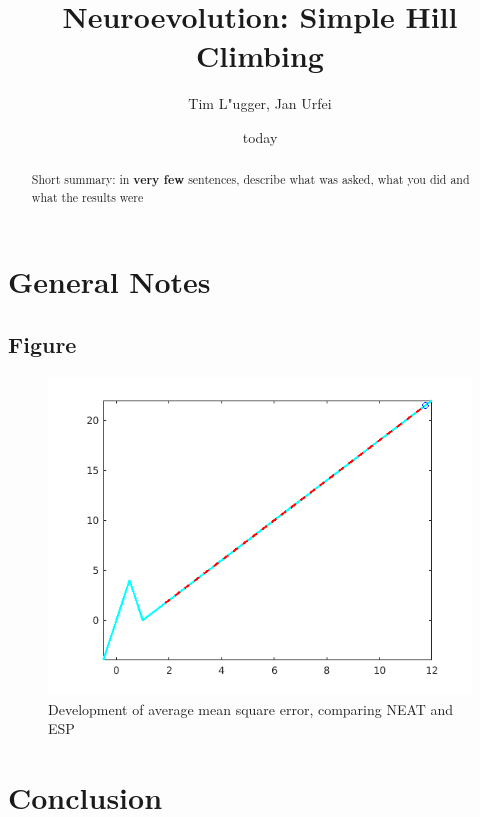 \documentclass{hbrs-ecta-report}
\begin{document}

\title{Neuroevolution: Simple Hill Climbing}
\subtitle{}

\author{
\alignauthor
Tim L"ugger, Jan Urfei
}

\date{today}
\maketitle
\begin{abstract}
Short summary: in \textbf{very few} sentences, describe what was asked, what you did and what the results were
\end{abstract}

\section{General Notes}

\FloatBarrier
\newpage
\subsection{Figure}

\begin{figure}[ht!]
\centering
\includegraphics[width=\linewidth]{img/plot_fit_max.png}
\caption{Development of average mean square error, comparing NEAT and ESP}
\label{fig:1} 
\end{figure}

\FloatBarrier
\section{Conclusion}



 
\end{document}
